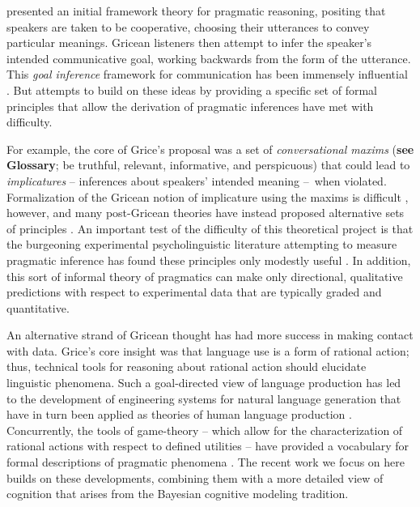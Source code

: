 \documentclass[]{elsarticle}
\begin{document}
\citet{grice1975} presented an initial framework theory for pragmatic
reasoning, positing that speakers are taken to be cooperative, choosing
their utterances to convey particular meanings. Gricean listeners then
attempt to infer the speaker's intended communicative goal, working
backwards from the form of the utterance. This \emph{goal inference}
framework for communication has been immensely influential \cite[e.g.,][]{horn1984,sperber1986,clark1996,levinson2000}. But
attempts to build on these ideas by providing a specific set of formal
principles that allow the derivation of pragmatic inferences have met
with difficulty.

For example, the core of Grice's proposal was a set of
\emph{conversational maxims} (\textbf{see Glossary}; be truthful,
relevant, informative, and perspicuous) that could lead to
\emph{implicatures} -- inferences about speakers' intended meaning
--~when violated. Formalization of the Gricean notion of
implicature using the maxims is difficult \cite[e.g.,][]{hirschberg1985}, however, and many
post-Gricean theories have instead proposed alternative sets of
principles \citep{sperber1986,levinson2000}. An important test
of the difficulty of this theoretical project is that the burgeoning
experimental psycholinguistic literature attempting to measure pragmatic
inference has found these principles only modestly useful \citep{breheny2006,huang2009,noveck2008}. In addition, this sort of informal theory of pragmatics can make only directional,
qualitative predictions with respect to experimental data that are typically graded and
quantitative.

An alternative strand of Gricean thought has had more success in making
contact with data. Grice's core insight was that language use is a form
of rational action; thus, technical tools for reasoning about rational
action should elucidate linguistic phenomena. Such a goal-directed view
of language production has led to the development of engineering systems
for natural language generation \citep{dale1995} that have in turn
been applied as theories of human language production \citep[e.g.,][]{viethen2006}. Concurrently, the tools of game-theory -- which allow for
the characterization of rational actions with respect to defined
utilities -- have provided a vocabulary for formal descriptions of
pragmatic phenomena \citep[e.g.,][]{benz2006,jager2008}. The recent work we focus on
here builds on these developments, combining them with a more detailed
view of cognition that arises from the Bayesian cognitive modeling
tradition.
\end{document}
